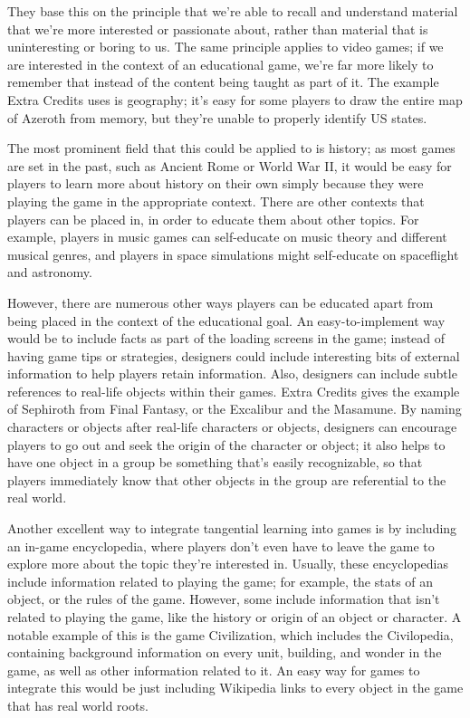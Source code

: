 \documentclass[12pt]{report}
\begin{document}
		They base this on the principle that we're able to recall and understand material that we're more interested or passionate about, rather than material that is uninteresting or boring to us. The same principle applies to video games; if we are interested in the context of an educational game, we're far more likely to remember that instead of the content being taught as part of it. The example Extra Credits uses is geography; it's easy for some players to draw the entire map of Azeroth from memory, but they're unable to properly identify US states.
		
		The most prominent field that this could be applied to is history; as most games are set in the past, such as Ancient Rome or World War II, it would be easy for players to learn more about history on their own simply because they were playing the game in the appropriate context. There are other contexts that players can be placed in, in order to educate them about other topics. For example, players in music games can self-educate on music theory and different musical genres, and players in space simulations might self-educate on spaceflight and astronomy. 
		
		However, there are numerous other ways players can be educated apart from being placed in the context of the educational goal. An easy-to-implement way would be to include facts as part of the loading screens in the game; instead of having game tips or strategies, designers could include interesting bits of external information to help players retain information. Also, designers can include subtle references to real-life objects within their games. Extra Credits gives the example of Sephiroth from Final Fantasy, or the Excalibur and the Masamune. By naming characters or objects after real-life characters or objects, designers can encourage players to go out and seek the origin of the character or object; it also helps to have one object in a group be something that's easily recognizable, so that players immediately know that other objects in the group are referential to the real world.
		
		Another excellent way to integrate tangential learning into games is by including an in-game encyclopedia, where players don't even have to leave the game to explore more about the topic they're interested in. Usually, these encyclopedias include information related to playing the game; for example, the stats of an object, or the rules of the game. However, some include information that isn't related to playing the game, like the history or origin of an object or character. A notable example of this is the game Civilization, which includes the Civilopedia, containing background information on every unit, building, and wonder in the game, as well as other information related to it. An easy way for games to integrate this would be just including Wikipedia links to every object in the game that has real world roots.
	
\end{document}
